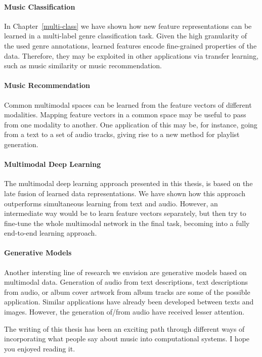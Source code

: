 \paragraph{Music Classification} In Chapter~\ref{multi-class} we have shown how new feature representations can be learned in a multi-label genre classification task. Given the high granularity of the used genre annotations, learned features encode fine-grained properties of the data. Therefore, they may be exploited in other applications via transfer learning, such as music similarity or music recommendation. 

\paragraph{Music Recommendation} Common multimodal spaces can be learned from the feature vectors of different modalities. Mapping feature vectors in a common space may be useful to pass from one modality to another. One application of this may be, for instance, going from a text to a set of audio tracks, giving rise to a new method for playlist generation.

\paragraph{Multimodal Deep Learning}
The multimodal deep learning approach presented in this thesis, is based on the late fusion of learned data representations. We have shown how this approach outperforms simultaneous learning from text and audio. However, an intermediate way would be to learn feature vectors separately, but then try to fine-tune the whole multimodal network in the final task, becoming into a fully end-to-end learning approach.

\paragraph{Generative Models} Another intersting line of research we envision are generative models based on multimodal data. Generation of audio from text descriptions, text descriptions from audio, or album cover artwork from album tracks are some of the possible application. Similar applications have already been developed between texts and images. However, the generation of/from audio have received lesser attention.

The writing of this thesis has been an exciting path through different ways of incorporating what people say about music into computational systems. I hope you enjoyed reading it.